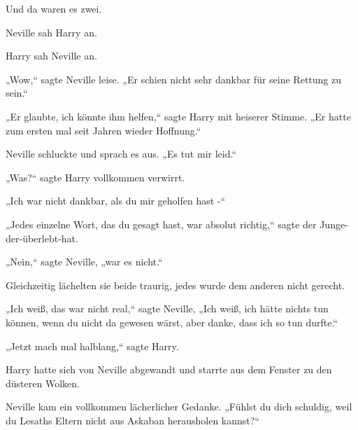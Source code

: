 Und da waren es zwei.

Neville sah Harry an.

Harry sah Neville an.

„Wow,“ sagte Neville leise. „Er schien nicht sehr dankbar für seine Rettung zu sein.“

„Er glaubte, ich könnte ihm helfen,“ sagte Harry mit heiserer Stimme. „Er hatte zum ersten mal seit Jahren wieder Hoffnung.“

Neville schluckte und sprach es aus. „Es tut mir leid.“

„Was?“ sagte Harry vollkommen verwirrt.

„Ich war nicht dankbar, als du mir geholfen hast -“

„Jedes einzelne Wort, das du gesagt hast, war absolut richtig,“ sagte der Junge-der-überlebt-hat.

„Nein,“ sagte Neville, „war es nicht.“

Gleichzeitig lächelten sie beide traurig, jedes wurde dem anderen nicht gerecht.

„Ich weiß, das war nicht real,“ sagte Neville, „Ich weiß, ich hätte nichts tun können, wenn du nicht da gewesen wärst, aber danke, dass ich so tun durfte.“

„Jetzt mach mal halblang,“ sagte Harry.

Harry hatte sich von Neville abgewandt und starrte aus dem Fenster zu den düsteren Wolken.

Neville kam ein vollkommen lächerlicher Gedanke. „Fühlst du dich schuldig, weil du Lesaths Eltern nicht aus Askaban herausholen kannst?“

